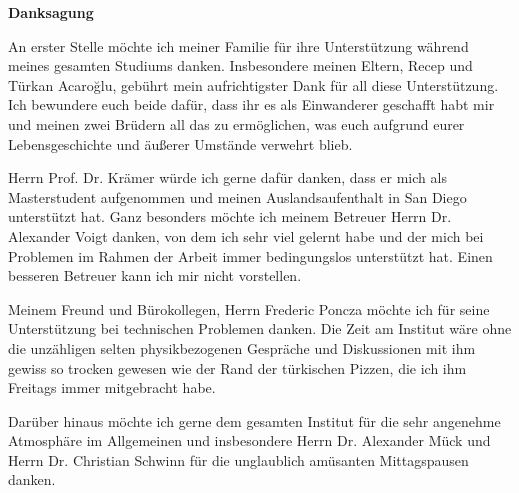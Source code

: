 \documentclass[a4paper,12pt]{book}
\begin{document}
\nocite{*}
{}

\newpage{}
\thispagestyle{empty}
\noindent
\begin{center}
\Large \textbf{Danksagung}\\
\end{center}
An erster Stelle möchte ich meiner Familie für ihre Unterstützung während meines gesamten Studiums danken. Insbesondere meinen Eltern, Recep und Türkan Acaroğlu, gebührt mein aufrichtigster Dank für all diese Unterstützung. Ich bewundere euch beide dafür, dass ihr es als Einwanderer geschafft habt mir und meinen zwei Brüdern all das zu ermöglichen, was euch aufgrund eurer Lebensgeschichte und äußerer Umstände verwehrt blieb.\par 
Herrn Prof. Dr. Krämer würde ich gerne dafür danken, dass er mich als Masterstudent aufgenommen und meinen Auslandsaufenthalt in San Diego unterstützt hat. Ganz besonders möchte ich meinem Betreuer Herrn Dr. Alexander Voigt danken, von dem ich sehr viel gelernt habe und der mich bei Problemen im Rahmen der Arbeit immer bedingungslos unterstützt hat. Einen besseren Betreuer kann ich mir nicht vorstellen.\par 
Meinem Freund und Bürokollegen, Herrn Frederic Poncza möchte ich für seine Unterstützung bei technischen Problemen danken. Die Zeit am Institut wäre ohne die unzähligen selten physikbezogenen Gespräche und Diskussionen mit ihm gewiss so trocken gewesen wie der Rand der türkischen Pizzen, die ich ihm Freitags immer mitgebracht habe.\par 
Darüber hinaus möchte ich gerne dem gesamten Institut für die sehr angenehme Atmosphäre im Allgemeinen und insbesondere Herrn Dr. Alexander Mück und Herrn Dr. Christian Schwinn für die unglaublich amüsanten Mittagspausen danken. 
\end{document}
